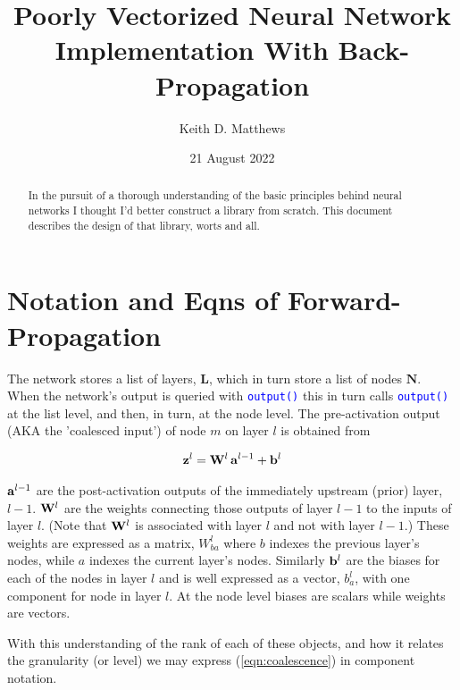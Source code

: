 \documentclass[twocolumn]{revtex4-1}
\newcommand{\code}[1]{\textcolor{blue}{\lstinline{#1}}}
\newcommand{\bld}[1]{\vectorbold{#1}}
\begin{document}
\title{Poorly Vectorized Neural Network Implementation With Back-Propagation}
\author{Keith D. Matthews}

\date{21 August 2022}

\begin{abstract}
In the pursuit of a thorough understanding of the basic principles behind neural networks I thought I'd better construct a library from scratch. This document describes the design of that library, worts and all.
\end{abstract}

\maketitle


\section{Notation and Eqns of Forward-Propagation}

The network stores a list of layers, $\textbf{L}$, which in turn store a list of nodes $\textbf{N}$. When the network's output is queried with \code{output()} this in turn calls \code{output()} at the list level, and then, in turn, at the node level. The pre-activation output (AKA the 'coalesced input') of node $m$ on layer $l$ is obtained from

\begin{align}
    \label{eqn:coalescence}
    \bld{z}^l = \bld{W}^l \, \bld{a}^{l - 1} + \bld{b}^l
\end{align}

$\bld{a}^{l - 1}$ are the post-activation outputs of the immediately upstream (prior) layer, $l-1$. $\bld{W}^l$ are the weights connecting those outputs of layer $l - 1$ to the inputs of layer $l$. (Note that $\bld{W}^l$ is associated with layer $l$ and not with layer $l-1$.) These weights are expressed as a matrix, $W^l_{b a}$ where $b$ indexes the previous layer's nodes, while $a$ indexes the current layer's nodes. Similarly $\bld{b}^l$ are the biases for each of the nodes in layer $l$ and is well expressed as a vector, $b^l_a$, with one component for node in layer $l$. At the node level biases are scalars while weights are vectors.

With this understanding of the rank of each of these objects, and how it relates the granularity (or level) we may express (\ref{eqn:coalescence}) in component notation.
\end{document}
